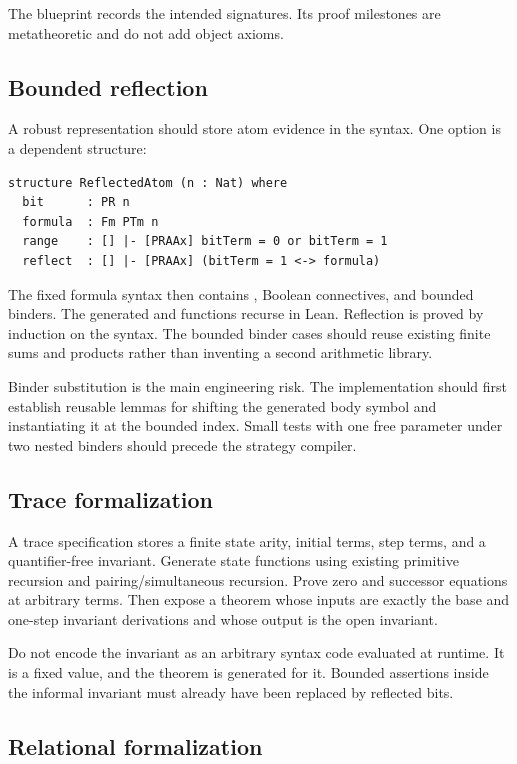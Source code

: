 The blueprint  records the intended
signatures.  Its proof milestones are metatheoretic and do not add object
axioms.

\subsection{Bounded reflection}

A robust representation should store atom evidence in the syntax.  One option
is a dependent structure:
\begin{lstlisting}[language={}]
structure ReflectedAtom (n : Nat) where
  bit      : PR n
  formula  : Fm PTm n
  range    : [] |- [PRAAx] bitTerm = 0 or bitTerm = 1
  reflect  : [] |- [PRAAx] (bitTerm = 1 <-> formula)
\end{lstlisting}
The fixed formula syntax then contains , Boolean
connectives, and bounded binders.  The generated  and
 functions recurse in Lean.  Reflection is proved by induction on
the syntax.  The bounded binder cases should reuse existing finite sums and
products rather than inventing a second arithmetic library.

Binder substitution is the main engineering risk.  The implementation should
first establish reusable lemmas for shifting the generated body symbol and
instantiating it at the bounded index.  Small tests with one free parameter
under two nested binders should precede the strategy compiler.

\subsection{Trace formalization}

A trace specification stores a finite state arity, initial terms, step terms,
and a quantifier-free invariant.  Generate state functions using existing
primitive recursion and pairing/simultaneous recursion.  Prove zero and
successor equations at arbitrary terms.  Then expose a theorem whose inputs
are exactly the base and one-step invariant derivations and whose output is the
open invariant.

Do not encode the invariant as an arbitrary syntax code evaluated at runtime.
It is a fixed  value, and the theorem is generated for it.
Bounded assertions inside the informal invariant must already have been
replaced by reflected bits.

\subsection{Relational formalization}


